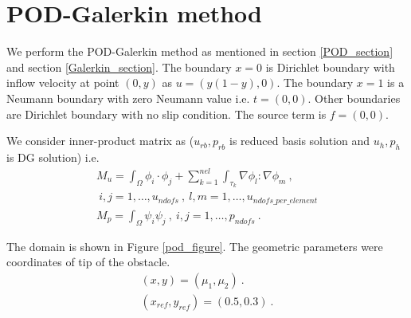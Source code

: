 \documentclass[a4paper,oneside,openright,spanish,english]{book}
\begin{document}
%

\section{POD-Galerkin method}

We perform the POD-Galerkin method as mentioned in section \ref{POD_section} and section \ref{Galerkin_section}. The boundary ${x=0}$ is Dirichlet boundary with inflow velocity at point $(0,y)$ as $u = (y(1-y), 0)$. The boundary ${x = 1}$ is a Neumann boundary with zero Neumann value i.e. $t = (0, 0)$. Other boundaries are Dirichlet boundary with no slip condition. The source term is $f = (0,0)$.

We consider inner-product matrix as ($u_{rb},p_{rb}$ is reduced basis solution and $u_h,p_h$ is DG solution) i.e.
\begin{gather*}
M_u = \int_{\Omega} \phi_i \cdot \phi_j + \sum_{k=1}^{nel} \int_{\tau_k} \nabla \phi_l : \nabla \phi_m \ ,  \\ \ i,j = 1, \ldots, u_{ndofs} \ , \ l,m = 1,\ldots,u_{ndofs\_per\_element} \\
M_p = \int_{\Omega} \psi_i \psi_j \ , \ i,j = 1, \ldots, p_{ndofs} \ .
\end{gather*}

The domain is shown in Figure \ref{pod_figure}. The geometric parameters were coordinates of tip of the obstacle.
\begin{gather*}
(x,y) = (\mu_1,\mu_2) \ . \\
(x_{ref},y_{ref}) = (0.5,0.3) \ .
\end{gather*}
\end{document}
